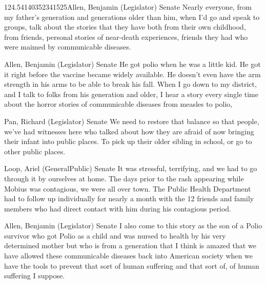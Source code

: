 \begin{result}{124.54140352341525}{Allen, Benjamin (Legislator) Senate}
Nearly everyone, from my father's generation and generations older than him, when I'd go and speak to groups, talk about the stories that they have both from their own childhood, from friends, personal stories of near-death experiences, friends they had who were maimed by communicable diseases.
\end{result}

\begin{result}{34.29720621046978}{Allen, Benjamin (Legislator) Senate}
He got polio when he was a little kid. He got it right before the vaccine became widely available. He doesn't even have the arm strength in his arms to be able to break his fall. When I go down to my district, and I talk to folks from his generation and older, I hear a story every single time about the horror stories of communicable diseases from measles to polio,
\end{result}

\begin{result}{26.05429533906798}{Pan, Richard (Legislator) Senate}
We need to restore that balance so that people, we've had witnesses here who talked about how they are afraid of now bringing their infant into public places. To pick up their older sibling in school, or go to other public places.
\end{result}

\begin{result}{25.088158617771164}{Loop, Ariel (GeneralPublic) Senate}
It was stressful, terrifying, and we had to go through it by ourselves at home. The days prior to the rash appearing while Mobius was contagious, we were all over town. The Public Health Department had to follow up individually for nearly a month with the 12 friends and family members who had direct contact with him during his contagious period.
\end{result}

\begin{result}{24.77568407629558}{Allen, Benjamin (Legislator) Senate}
I also come to this story as the son of a Polio survivor who got Polio as a child and was nursed to health by his very determined mother but who is from a generation that I think is amazed that we have allowed these communicable diseases back into American society when we have the tools to prevent that sort of human suffering and that sort of, of human suffering I suppose.
\end{result}

